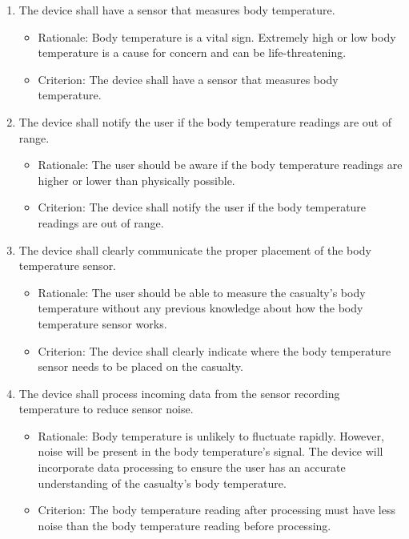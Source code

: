 \documentclass{article}
\begin{document}
        \begin{enumerate}[label = \textbf{{FR5.}\arabic*} ]
        \item The device shall have a sensor that measures body temperature.
            \begin{itemize}
                \item Rationale: Body temperature is a vital sign.  Extremely high or low body temperature is a cause for concern and can be life-threatening. 
                \item Criterion: The device shall have a sensor that measures body temperature.
            \end{itemize}
            
        \item The device shall notify the user if the body temperature readings are out of range.
            \begin{itemize}
                \item Rationale: The user should be aware if the body temperature readings are higher or lower than physically possible. 
                \item Criterion: The device shall notify the user if the body temperature readings are out of range.
            \end{itemize}    
            
        \item The device shall clearly communicate the proper placement of the body temperature sensor.
            \begin{itemize}
                \item Rationale: The user should be able to measure the casualty's body temperature without any previous knowledge about how the body temperature sensor works. 
                \item Criterion: The device shall clearly indicate where the body temperature sensor needs to be placed on the casualty.
            \end{itemize}  
        
        \item The device shall process incoming data from the sensor recording temperature to reduce sensor noise.
            \begin{itemize}
                \item Rationale:  Body temperature is unlikely to fluctuate rapidly.  However, noise will be present in the body temperature's signal.  The device will incorporate data processing to ensure the user has an accurate understanding of the casualty's body temperature.
                \item Criterion: The body temperature reading after processing must have less noise than the body temperature reading before processing.
            \end{itemize}
            

\end{enumerate}
\end{document}
